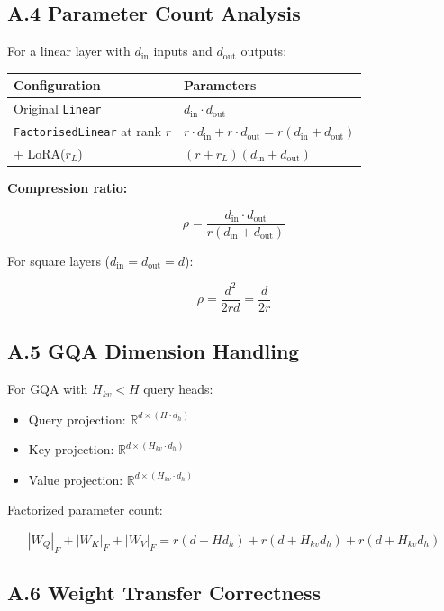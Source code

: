 \subsection{A.4 Parameter Count Analysis}

For a linear layer with $d_\text{in}$ inputs and $d_\text{out}$ outputs:

\begin{table}[H]
\centering
\small
\begin{tabular}{ll}
\toprule
\textbf{Configuration} & \textbf{Parameters} \\
\midrule
Original \texttt{Linear} & $d_\text{in} \cdot d_\text{out}$ \\
\texttt{FactorisedLinear} at rank $r$ & $r \cdot d_\text{in} + r \cdot d_\text{out} = r(d_\text{in} + d_\text{out})$ \\
+ LoRA($r_L$) & $(r + r_L)(d_\text{in} + d_\text{out})$ \\
\bottomrule
\end{tabular}
\end{table}

\textbf{Compression ratio:}

\[
\rho = \frac{d_\text{in} \cdot d_\text{out}}{r(d_\text{in} + d_\text{out})}
\tag{A.5}
\]

For square layers ($d_\text{in} = d_\text{out} = d$):

\[
\rho = \frac{d^2}{2rd} = \frac{d}{2r}
\tag{A.6}
\]

\subsection{A.5 GQA Dimension Handling}

For GQA with $H_{kv} < H$ query heads:

\begin{itemize}
\item Query projection: $\mathbb{R}^{d \times (H \cdot d_h)}$
\item Key projection: $\mathbb{R}^{d \times (H_{kv} \cdot d_h)}$
\item Value projection: $\mathbb{R}^{d \times (H_{kv} \cdot d_h)}$

\end{itemize}
Factorized parameter count:

\[
|W_Q|_F + |W_K|_F + |W_V|_F = r(d + H d_h) + r(d + H_{kv} d_h) + r(d + H_{kv} d_h)
\tag{A.7}
\]

\subsection{A.6 Weight Transfer Correctness}

